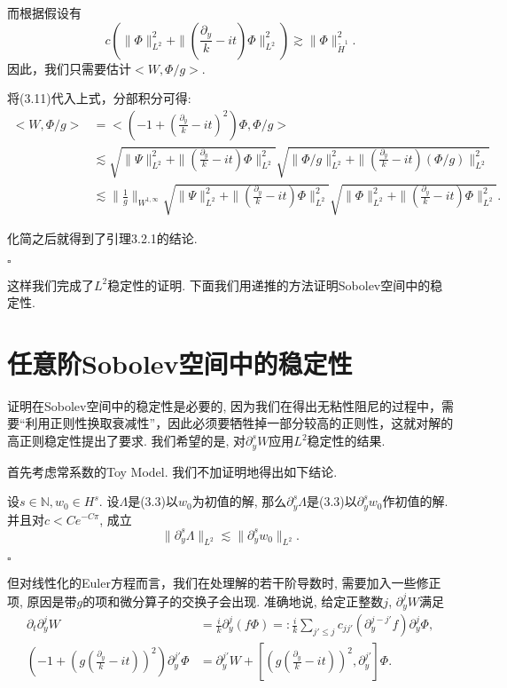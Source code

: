 而根据假设有$$c(\|\Phi\|_{L^2}^2+\|(\frac{\partial_y}{k}-it)\Phi\|_{L^2}^2)\gtrsim \|\Phi\|_{\tilde{H}^1}^2.$$ 因此，我们只需要估计$<W,\Phi/g>$.

将(3.11)代入上式，分部积分可得:
\begin{equation}
\begin{aligned}
<W,\Phi/g>&=<(-1+(\frac{\partial_y}{k}-it)^2)\Phi,\Phi/g> \\
&\lesssim\sqrt{\|\Psi\|_{L^2}^2+\|(\frac{\partial_y}{k}-it)\Phi\|_{L^2}^2}\sqrt{\|\Phi/g\|_{L^2}^2+\|(\frac{\partial_y}{k}-it)(\Phi/g)\|_{L^2}^2} \\
&\lesssim\|\frac{1}{g}\|_{W^{1,\infty}}\sqrt{\|\Psi\|_{L^2}^2+\|(\frac{\partial_y}{k}-it)\Phi\|_{L^2}^2}\sqrt{\|\Phi\|_{L^2}^2+\|(\frac{\partial_y}{k}-it)\Phi\|_{L^2}^2}.
\end{aligned}
\end{equation}

化简之后就得到了引理3.2.1的结论. 

\begin{flushright}
$\square$
\end{flushright}

这样我们完成了$L^2$稳定性的证明. 下面我们用递推的方法证明Sobolev空间中的稳定性. 

\section{任意阶Sobolev空间中的稳定性}

证明在Sobolev空间中的稳定性是必要的, 因为我们在得出无粘性阻尼的过程中，需要“利用正则性换取衰减性”，因此必须要牺牲掉一部分较高的正则性，这就对解的高正则稳定性提出了要求. 我们希望的是, 对$\partial_y^s W$应用$L^2$稳定性的结果.

首先考虑常系数的Toy Model. 我们不加证明地得出如下结论.


\begin{cor}\songti\rm
设$s\in \mathbb{N},w_0\in H^s$. 设$\Lambda$是(3.3)以$w_0$为初值的解, 那么$\partial_y^s \Lambda$是(3.3)以$\partial_y^s w_0$作初值的解. 并且对$c<Ce^{-C\pi}$, 成立$$\|\partial_y^s\Lambda\|_{L^2}\lesssim\|\partial_y^s w_0\|_{L^2}.$$
\end{cor}
\begin{flushright}
$\square$
\end{flushright}

但对线性化的Euler方程而言，我们在处理解的若干阶导数时, 需要加入一些修正项, 原因是带$g$的项和微分算子的交换子会出现. 准确地说, 给定正整数$j$, $\partial_y^jW$满足
\begin{equation}
\begin{aligned}
\partial_t\partial_y^jW &=\frac{i}{k}\partial_y^j(f\Phi)=:\frac{i}{k}\sum_{j'\leq j}c_{jj'}(\partial_y^{j-j'}f)\partial_y^j\Phi, \\
(-1+(g(\frac{\partial_y}{k}-it))^2)\partial_y^{j'}\Phi&=\partial_y^{j'}W+[(g(\frac{\partial_y}{k}-it))^2,\partial_{y}^{j'}]\Phi.
\end{aligned}
\end{equation}

